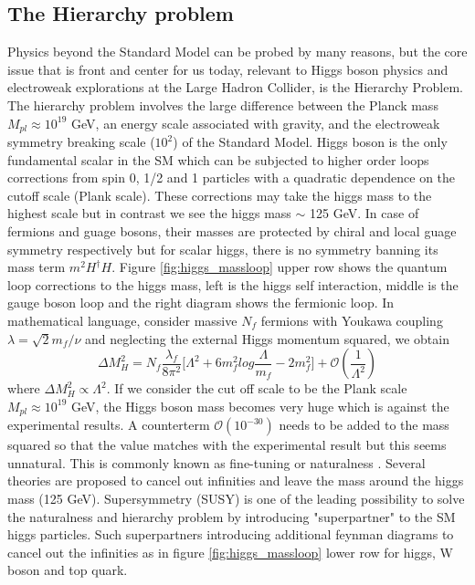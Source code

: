 \subsection{The Hierarchy problem}\label{subsec:hierarchy}
Physics beyond the Standard Model can be probed by many reasons, but the core issue that is front and center for us today, relevant to Higgs boson physics and electroweak explorations at the Large Hadron Collider, is the Hierarchy Problem. The hierarchy problem involves the large difference between the Planck mass $M_{pl} \approx 10^{19}$ GeV, an energy scale associated with gravity, and the electroweak symmetry breaking scale ($10^{2}$) of the Standard Model. Higgs boson is the only fundamental scalar in the SM which can be subjected to higher order loops corrections from spin 0, 1/2 and 1 particles with a quadratic dependence on the cutoff scale (Plank scale). These corrections may take the higgs mass to the highest scale but in contrast we see the higgs mass $\sim$ 125 GeV. In case of fermions and guage bosons, their masses are protected by chiral and local guage symmetry respectively but for scalar higgs, there is no symmetry banning its mass term $m^{2}H^{\dagger}H$. Figure \ref{fig:higgs_massloop} upper row shows the quantum loop corrections to the higgs mass, left is the higgs self interaction, middle is the gauge boson loop and the right diagram shows the fermionic loop. In mathematical language, consider massive $N_{f}$ fermions with Youkawa coupling $\lambda = \sqrt{2}m_{f}/\nu$ and neglecting the external Higgs momentum squared, we obtain
\begin{equation}\label{equ:hierarchy}
\Delta M_{H}^{2} = N_{f}\frac{\lambda_{f}}{8\pi^{2}}\Big[\Lambda^{2} + 6m_{f}^{2}log\frac{\Lambda}{m_{f}} - 2m_{f}^{2} \Big] + \mathcal{O}(\frac{1}{\Lambda^{2}})
\end{equation}
where $\Delta M_{H}^{2}\propto \Lambda^{2}$. If we consider the cut off scale to be the Plank scale $M_{pl} \approx 10^{19}$ GeV, the Higgs boson mass becomes very huge which is against the experimental results. A counterterm $\mathcal{O}(10^{-30})$ needs to be added to the mass squared so that the value matches with the experimental result but this seems unnatural. This is commonly known as fine-tuning or naturalness \cite{hierarchy}. Several theories are proposed to cancel out infinities and leave the mass around the higgs mass (125 GeV). Supersymmetry (SUSY) is one of the leading possibility to solve the naturalness and hierarchy problem by introducing "superpartner" to the SM higgs particles. Such superpartners introducing additional feynman diagrams to cancel out the infinities as in figure \ref{fig:higgs_massloop} lower row for higgs, W boson and top quark.     

